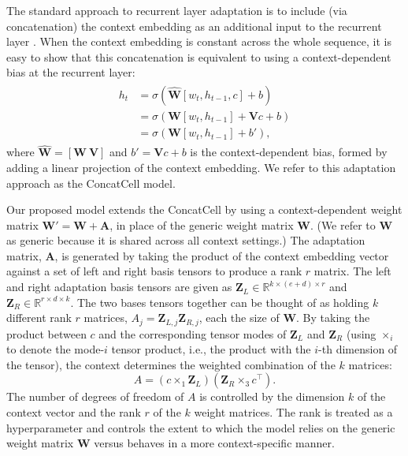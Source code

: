 The standard approach to recurrent layer adaptation is to include (via concatenation) the context embedding as an additional input to the recurrent layer \cite{mikolov2012context}. When the context embedding is constant across the whole sequence, it is easy to show that this concatenation is equivalent to using a context-dependent bias at the recurrent layer:  
\begin{align}
\label{eq:ConcatCell}
\begin{split}
  h_t &= \sigma( \hat{\mathbf{W}}[w_t, h_{t-1}, c] + b) \\
      &= \sigma( \mathbf{W}[w_t, h_{t-1}] + \mathbf{V}c + b) \\
      &= \sigma( \mathbf{W}[w_t, h_{t-1}] + b'),
\end{split}
\end{align}
where 
$\hat{\mathbf{W}} = [ \mathbf{W} \  \mathbf{V} ]$ 
and $b' = \mathbf{V}c + b$ is the context-dependent bias, formed by adding a linear projection of the context embedding. We refer to this adaptation approach as the ConcatCell model. 

Our proposed model extends the ConcatCell by using a context-dependent weight matrix
$\mbox{$\mathbf{W}' = \mathbf{W} + \mathbf{A}$}$, in place of the generic weight matrix $\mathbf{W}$. (We refer to $\mathbf{W}$ as generic because it is shared across all context settings.) 
The adaptation matrix, $\mathbf{A}$, is generated by taking the product of the context embedding vector against a set of left and right basis tensors to produce a rank $r$ matrix. 
The left and right adaptation basis tensors are given as  $\mathbf{Z}_L \in \mathbb{R}^{k \times (e+d) \times r}$ and $\mathbf{Z}_R \in \mathbb{R}^{r \times d \times k}$. The two bases tensors together can be thought of as holding $k$ different rank $r$ matrices, $A_j=\mathbf{Z}_{L,j}\mathbf{Z}_{R,j}$, each the size of $\mathbf{W}$. By taking the product between $c$ and the corresponding tensor modes of $\mathbf{Z}_L$ and $\mathbf{Z}_R$ (using $\times_i$ to denote the mode-$i$ tensor product, i.e., the product with the $i$-th dimension of the tensor), the context determines the weighted combination of the $k$ matrices:
\begin{equation}
\label{eq:w_prime}
  A=(c \times_1 \mathbf{Z}_L)(\mathbf{Z}_R \times_3 c^\intercal) .  
\end{equation}
The number of degrees of freedom of $A$ is controlled by the dimension $k$ of the context vector and the rank $r$ of the $k$ weight matrices. The rank is treated as a hyperparameter and controls the extent to which the model relies on the generic weight matrix $\mathbf{W}$ versus behaves in a more context-specific manner.

